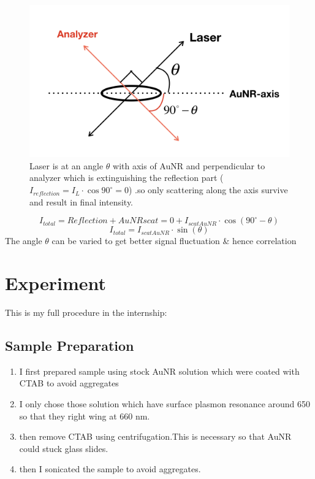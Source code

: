 \documentclass[twoside,single]{lion-msc}
\begin{document}
\begin{figure}[H]
\includegraphics[width=1\textwidth,left]{9}
\caption {Laser is at an angle $\theta$ with axis of AuNR and perpendicular to analyzer which is extinguishing the reflection part (
$ I_{reflection} = I_{L}\cdot\cos90^{\circ} = 0$) .so only scattering along the axis survive and result in final intensity.}
\end{figure}
$$
I_{total} = Reflection+AuNRscat = 0 +   I_{scatAuNR}\cdot\cos(90^{\circ}-\theta)
$$
$$
I_{total} = I_{scatAuNR}\cdot\sin(\theta)
$$
The angle $\theta$ can be varied to get better signal fluctuation \& hence correlation

\chapter{Experiment}
This is my full procedure in the internship:

\section{Sample Preparation}
 \begin{enumerate}[I]
   \item I first prepared sample using stock AuNR solution which were coated with CTAB to avoid aggregates
   \item I only chose those solution which have surface plasmon resonance around 650 so that they right wing at 660 nm.
   \item then remove CTAB using centrifugation.This is necessary so that AuNR could stuck glass slides.
   \item then I sonicated the sample to avoid aggregates.
   \end{enumerate}
\end{document}
